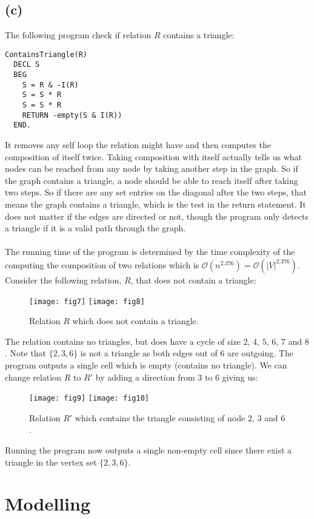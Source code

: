 \documentclass[a4paper, fleqn]{article}
\begin{document}
\subsection{(c)}
The following program check if relation $R$ contains a triangle:
\begin{verbatim}
ContainsTriangle(R)
  DECL S
  BEG
    S = R & -I(R)
    S = S * R
    S = S * R
    RETURN -empty(S & I(R))
  END.
\end{verbatim}
It removes any self loop the relation might have and then computes the composition of
itself twice. Taking composition with itself actually tells us what nodes can be
reached from any node by taking another step in the graph. So if the graph contains a
triangle, a node should be able to reach itself after taking two steps. So if there are
any set entries on the diagonal after the two steps, that means the graph contains a
triangle, which is the test in the return statement. It does not matter if the edges are
directed or not, though the program only detects a triangle if it is a valid path through
the graph.\\
\\
The running time of the program is determined by the time complexity of the computing the
composition of two relations which is $\mathcal{O}(n^{2.376})=\mathcal{O}(|V|^{2.376})$.
\\
Consider the following relation, $R$, that does not contain a triangle:
\begin{figure}[H]
  \centering
  \texttt{[image: fig7]}
  \texttt{[image: fig8]}
  \caption{Relation $R$ which does not contain a triangle.}
\end{figure}
The relation contains no triangles, but does have a cycle of size $2$, $4$, $5$, $6$, $7$
and $8$. Note that $\{2,3,6\}$ is not a triangle as both edges out of $6$ are outgoing.
The program outputs a single cell which is empty (contains no triangle). We can change
relation $R$ to $R'$ by adding a direction from $3$ to $6$ giving us:
\begin{figure}[H]
  \centering
  \texttt{[image: fig9]}
  \texttt{[image: fig10]}
  \caption{Relation $R'$ which contains the triangle consisting of node $2$, $3$ and $6$.}
\end{figure}
Running the program now outputs a single non-empty cell since there exist a triangle in the
vertex set $\{2,3,6\}$.

\section{Modelling}
\end{document}
